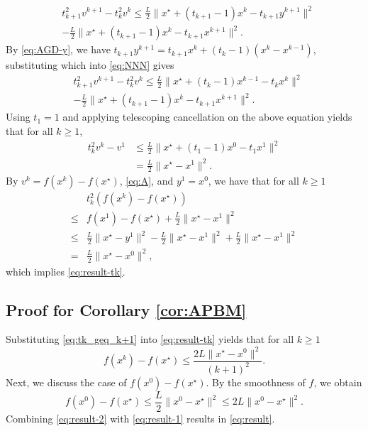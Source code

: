 \documentclass[letterpaper, 10 pt, conference]{ieeeconf}  %
\begin{document}
\begin{appendix}
\begin{equation}\label{eq:NNN}
    \begin{split}
        &t_{k+1}^2v^{k+1} - t_k^2v^k \leq \frac{L}{2}\|x^\star+(t_{k+1}-1)x^k-t_{k+1}y^{k+1}\|^2 \\ &- \frac{L}{2}\|x^\star+(t_{k+1}-1)x^k-t_{k+1}x^{k+1}\|^2.
    \end{split}
\end{equation}
By \eqref{eq:AGD-y}, we have $t_{k+1}y^{k+1} = t_{k+1}x^k + (t_k-1)(x^k-x^{k-1})$, substituting which into \eqref{eq:NNN} gives
\begin{equation*}
    \begin{split}
        &t_{k+1}^2v^{k+1} - t_k^2v^k \leq \frac{L}{2}\|x^\star+(t_{k}-1)x^{k-1}-t_{k}x^{k}\|^2  \\ &- \frac{L}{2}\|x^\star+(t_{k+1}-1)x^k-t_{k+1}x^{k+1}\|^2.
    \end{split}
\end{equation*}
Using $t_1 =1$ and applying telescoping cancellation on the above equation yields that for all $k \geq 1$,
\begin{align*}
    t_{k}^2v^{k}-v^1 &\leq \frac{L}{2}\|x^\star+(t_{1}-1)x^{0}-t_{1}x^{1}\|^2 \\
    & = \frac{L}{2}\|x^\star-x^1\|^2.
\end{align*}
By $v^k = f(x^k)-f(x^\star)$, \eqref{eq:A}, and $y^1=x^0$, we have that for all $k \geq 1$
\begin{equation*}
    \begin{split}
    &t_{k}^2(f(x^{k})-f(x^\star)) \\ \leq& f(x^1) -f(x^\star) + \frac{L}{2}\|x^\star-x^1\|^2 \\
    \leq& \frac{L}{2}\|x^\star-y^1\|^2 - \frac{L}{2}\|x^\star-x^1\|^2 + \frac{L}{2}\|x^\star-x^1\|^2\\
    =& \frac{L}{2}\|x^\star-x^0\|^2,
    \end{split}
\end{equation*}
which implies \eqref{eq:result-tk}.

\subsection{Proof for Corollary \ref{cor:APBM}}\label{appen:cor}
Substituting \eqref{eq:tk_geq_k+1} into \eqref{eq:result-tk} yields that for all $k \geq 1$
\begin{equation}\label{eq:result-1}
    f(x^{k}) -f(x^\star) \leq \frac{2L\|x^\star-x^0\|^2}{(k+1)^2}.
\end{equation}
Next, we discuss the case of $f(x^0)-f(x^\star)$. By the smoothness of $f$, we obtain
\begin{equation}\label{eq:result-2}
    f(x^0) - f(x^\star) \leq \frac{L}{2}\|x^0-x^\star\|^2 \leq 2L\|x^0-x^\star\|^2.
\end{equation}
Combining \eqref{eq:result-2} with \eqref{eq:result-1} results in \eqref{eq:result}.

\end{appendix}









\end{document}
